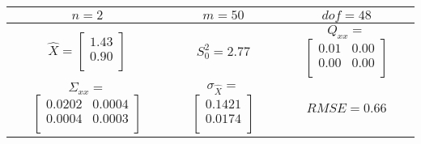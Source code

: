 \begin{table}[H]
\centering
\begin{tabular}{|c|c|c|}
\toprule
$n = 2$& %
$m = 50$& %
$dof = 48$\\ %
\midrule
$\hat{X} = $$
 \begin{bmatrix}
1.43\\
0.90\\
\end{bmatrix}
$
& %
$S_0^2 = 2.77$ & %
$Q_{xx} = $ $
 \begin{bmatrix}
0.01&0.00\\
0.00&0.00\\
\end{bmatrix}
$
\\ %
\midrule
$\Sigma_{xx} = $ $
 \begin{bmatrix}
0.0202&0.0004\\
0.0004&0.0003\\
\end{bmatrix}
$
& %
$\sigma_{\hat{X}} = $ $
 \begin{bmatrix}
0.1421\\
0.0174\\
\end{bmatrix}
$
& %
$RMSE = 0.66$\\ %
\bottomrule
\end{tabular}
\end{table}
